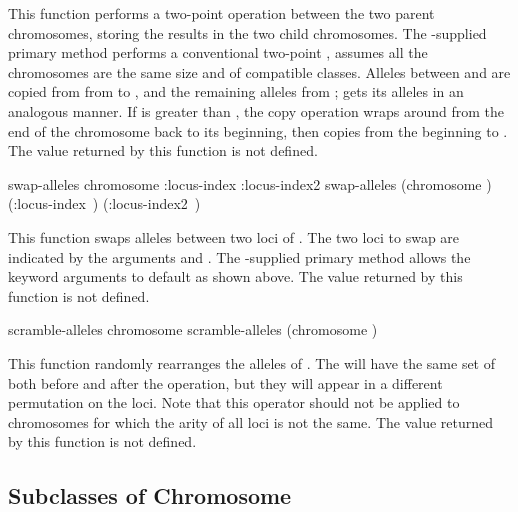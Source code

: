 {{This function performs a two-point  operation between the
two parent chromosomes, storing the results in the two child chromosomes. The
\geco-supplied primary method performs a conventional two-point , assumes
all the chromosomes are the same size and of compatible classes. Alleles between
 and  are copied from from  to
, and the remaining alleles from ;  gets
its alleles in an analogous manner. If  is greater than ,
the copy operation wraps around from the end of the chromosome back to its
beginning, then copies from the beginning to .
The value returned by this function is not defined.
\par}%

\filbreak
{\samepage
\Defgeneric swap-alleles {chromosome \key :locus-index :locus-index2}
\label{method:swap-alleles}
 swap-alleles {(chromosome ) \key
                         \hbox{(:locus-index )}
                         \hbox{(:locus-index2 )}}

This function swaps alleles between two loci of . The two loci to
swap are indicated by the arguments  and . The
\geco-supplied primary method allows the keyword arguments to default as shown
above.
The value returned by this function is not defined.
\par}%

\filbreak
{\samepage
\Defgeneric scramble-alleles {chromosome}
 scramble-alleles {(chromosome )}

This function randomly rearranges the alleles of . The
 will have the same set of  both before and after
the operation, but they will appear in a different permutation on the loci. Note
that this operator should not be applied to chromosomes for which the arity of all
loci is not the same.
The value returned by this function is not defined.
\par}%
\filbreak


\subsection{Subclasses of Chromosome}
	\label{sec:subclasses-of-chromosome}

}
